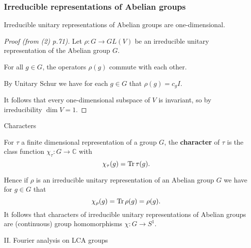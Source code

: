 \documentclass[mathserif
]{beamer}
\begin{document}
\begin{frame}
    \frametitle{Irreducible representations of Abelian groups}
    \begin{Corollary}
        Irreducible unitary representations of Abelian groups are one-dimensional.
    \end{Corollary}
    \pause

    \begin{proof}[Proof (from (2) p.71)]
        Let $\rho\colon G\to GL(V)$ be an irreducible unitary representation of the Abelian group $G$. \pause 
        
        For all $g\in G$, the operators $\rho(g)$ commute with each other. \pause 
        
        By Unitary Schur we have for each $g\in G$ that $\rho(g) = c_gI$. \pause

        It follows that every one-dimensional subspace of $V$ is invariant, so by irreducibility $\dim V = 1$.
    \end{proof} %
\end{frame}

\begin{frame}{Characters}
    \begin{definition}
        For $\tau$ a finite dimensional representation of a group $G$, the \textbf{character} of $\tau$ is the class function $\chi_\tau\colon G\to \mathbb{C}$ with \[\chi_\tau(g) = \Tr \tau(g).\]
    \end{definition}
    \pause

    Hence if $\rho$ is an irreducible unitary representation of an Abelian group $G$ we have for $g\in G$ that \[\chi_\rho(g) = \Tr \rho(g) = \rho(g).\]
    \pause
    It follows that characters of irreducible unitary representations of Abelian groups are (continuous) group homomorphisms $\chi\colon G\to S^1$.
\end{frame}

\begin{frame}{}
    \begin{block}{}{
        \begin{center}\Large II. Fourier analysis on LCA groups\end{center}}
    \end{block}
\end{frame}
\end{document}
